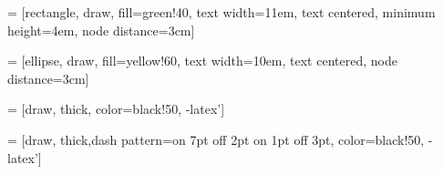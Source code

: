  = [rectangle, draw, fill=green!40, text width=11em, text centered, minimum height=4em, node distance=3cm]

 = [ellipse, draw, fill=yellow!60, text width=10em, text centered, node distance=3cm]

 = [draw, thick, color=black!50, -latex']

 = [draw, thick,dash pattern={on 7pt off 2pt on 1pt off 3pt}, color=black!50, -latex']


\usepackage{ntheorem}

\theoremstyle{break}
\newtheorem{definition}{Definition}

\theoremstyle{remark}
\newtheorem*{remark}{Remark}

\theoremstyle{nonumberbreak}
\theorembodyfont{\upshape}
\theoremseparator{:}
\newtheorem{LTL}{LTL Predicate}
